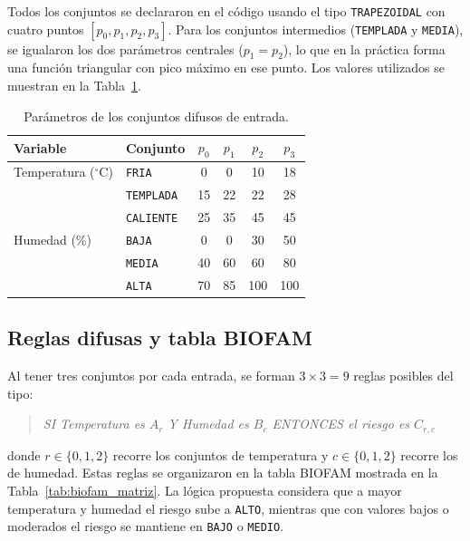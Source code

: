 \documentclass[conference]{IEEEtran}
\begin{document}
Todos los conjuntos se declararon en el código usando el tipo \texttt{TRAPEZOIDAL} con cuatro puntos \([p_0, p_1, p_2, p_3]\). Para los conjuntos intermedios (\texttt{TEMPLADA} y \texttt{MEDIA}), se igualaron los dos parámetros centrales (\(p_1 = p_2\)), lo que en la práctica forma una función triangular con pico máximo en ese punto. Los valores utilizados se muestran en la Tabla~\ref{tab:conjuntos_difusos}.

\begin{table}[htbp]
\centering
\caption{Parámetros de los conjuntos difusos de entrada.}
\label{tab:conjuntos_difusos}
\begin{tabular}{llcccc}
\toprule
Variable & Conjunto & \(p_0\) & \(p_1\) & \(p_2\) & \(p_3\) \\
\midrule
Temperatura (\(^\circ\)C) & \texttt{FRIA}     & 0  & 0  & 10 & 18 \\
                          & \texttt{TEMPLADA} & 15 & 22 & 22 & 28 \\
                          & \texttt{CALIENTE} & 25 & 35 & 45 & 45 \\
\midrule
Humedad (\%)              & \texttt{BAJA}     & 0  & 0  & 30 & 50 \\
                          & \texttt{MEDIA}    & 40 & 60 & 60 & 80 \\
                          & \texttt{ALTA}     & 70 & 85 & 100 & 100 \\
\bottomrule
\end{tabular}
\end{table}

\subsection{Reglas difusas y tabla BIOFAM}
Al tener tres conjuntos por cada entrada, se forman \(3 \times 3 = 9\) reglas posibles del tipo:
\begin{quote}
\textit{SI Temperatura es \(A_r\) Y Humedad es \(B_c\) ENTONCES el riesgo es \(C_{r,c}\)}
\end{quote}
donde \(r \in \{0, 1, 2\}\) recorre los conjuntos de temperatura y \(c \in \{0, 1, 2\}\) recorre los de humedad. Estas reglas se organizaron en la tabla BIOFAM mostrada en la Tabla~\ref{tab:biofam_matriz}. La lógica propuesta considera que a mayor temperatura y humedad el riesgo sube a \texttt{ALTO}, mientras que con valores bajos o moderados el riesgo se mantiene en \texttt{BAJO} o \texttt{MEDIO}.
\end{document}
